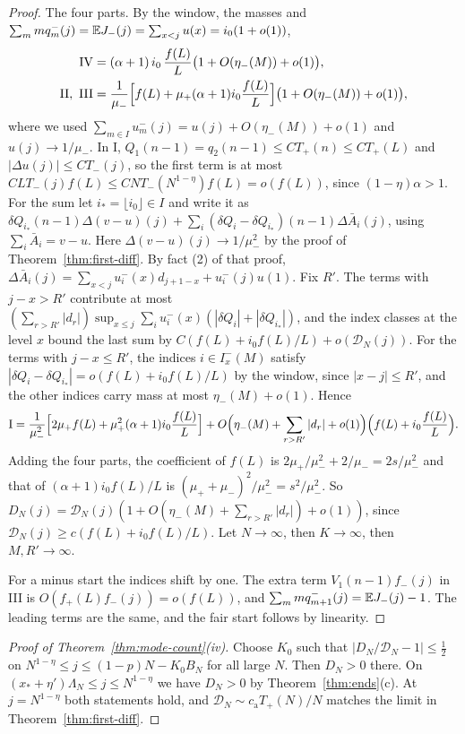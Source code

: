 \begin{proof}
The four parts. By the window, the masses and $\sum_mmq^{-}_m(j)=\mathbb{E} J_{-}(j)=\sum_{x<j}u(x)=i_0(1+o(1))$,
\begin{align*}
 \mathrm{IV}&=(\alpha+1)\,i_0\,\frac{f(L)}L\bigl(1+O(\eta_\minus(M))+o(1)\bigr),\\
 \mathrm{II},\ \mathrm{III}&=\frac1{\mu_\minus}\Bigl[f(L)+\mu_\plus(\alpha+1)i_0\frac{f(L)}L\Bigr]\bigl(1+O(\eta_\minus(M))+o(1)\bigr),
\end{align*}
where we used $\sum_{m\in I}u^\minus_m(j)=u(j)+O(\eta_\minus(M))+o(1)$ and $u(j)\to1/\mu_\minus$.
In I, $Q_1(n-1)=q_2(n-1)\le CT_\plus(n)\le CT_\plus(L)$ and $|\Delta u(j)|\le CT_\minus(j)$, so the
first term is at most $CLT_\minus(j)f(L)\le CNT_\minus(N^{1-\eta})f(L)=o(f(L))$, since
$(1-\eta)\alpha>1$. For the sum let $i_*=\lfloor i_0\rfloor\in I$ and write it as
$\delta Q_{i_*}(n-1)\Delta(v-u)(j)+\sum_i(\delta Q_i-\delta Q_{i_*})(n-1)\Delta\bar A_i(j)$, using
$\sum_i\bar A_i=v-u$. Here $\Delta(v-u)(j)\to1/\mu_\minus^2$ by the proof of
Theorem~\ref{thm:first-diff}. By fact (2) of that proof,
$\Delta\bar A_i(j)=\sum_{x<j}u^\minus_i(x)d_{j+1-x}+u^\minus_i(j)u(1)$. Fix $R'$. The terms with
$j-x>R'$ contribute at most $(\sum_{r>R'}|d_r|)\sup_{x\le j}\sum_iu^\minus_i(x)(|\delta Q_i|+|\delta Q_{i_*}|)$,
and the index classes at the level $x$ bound the last sum by $C(f(L)+i_0f(L)/L)+o(\mathcal D_N(j))$.
For the terms with $j-x\le R'$, the indices $i\in I^\minus_x(M)$ satisfy
$|\delta Q_i-\delta Q_{i_*}|=o(f(L)+i_0f(L)/L)$ by the window, since $|x-j|\le R'$, and the other
indices carry mass at most $\eta_\minus(M)+o(1)$. Hence
\[
 \mathrm I=\frac1{\mu_{-}^2}\Bigl[2\mu_{+} f(L)+\mu_{+}^2(\alpha+1)i_0\frac{f(L)}L\Bigr]
 +O\Bigl(\eta_{-}(M)+\sum_{r>R'}|d_r|+o(1)\Bigr)\Bigl(f(L)+i_0\frac{f(L)}L\Bigr).
\]
Adding the four parts, the coefficient of $f(L)$ is $2\mu_\plus/\mu_\minus^2+2/\mu_\minus=2s/\mu_\minus^2$
and that of $(\alpha+1)i_0f(L)/L$ is $(\mu_\plus+\mu_\minus)^2/\mu_\minus^2=s^2/\mu_\minus^2$. So
$D_N(j)=\mathcal D_N(j)(1+O(\eta_\minus(M)+\sum_{r>R'}|d_r|)+o(1))$, since
$\mathcal D_N(j)\ge c(f(L)+i_0f(L)/L)$. Let $N\to\infty$, then $K\to\infty$, then $M,R'\to\infty$.

For a minus start the indices shift by one. The extra term $V_1(n-1)f_\minus(j)$ in III is
$O(f_\plus(L)f_\minus(j))=o(f(L))$, and $\sum_mmq^{-}_{m+1}(j)=\mathbb{E} J_{-}(j)-1$. The leading
terms are the same, and the fair start follows by linearity.
\end{proof}

\begin{proof}[Proof of Theorem~\ref{thm:mode-count}(iv)]
Choose $K_0$ such that $|D_N/\mathcal D_N-1|\le\frac12$ on $N^{1-\eta}\le j\le(1-p)N-K_0B_N$ for all
large $N$. Then $D_N>0$ there. On $(x_*+\eta')\Lambda_N\le j\le N^{1-\eta}$ we have $D_N>0$ by
Theorem~\ref{thm:ends}(c). At $j=N^{1-\eta}$ both statements hold, and
$\mathcal D_N\sim c_{\mathrm a}T_\plus(N)/N$ matches the limit in Theorem~\ref{thm:first-diff}.
\end{proof}

